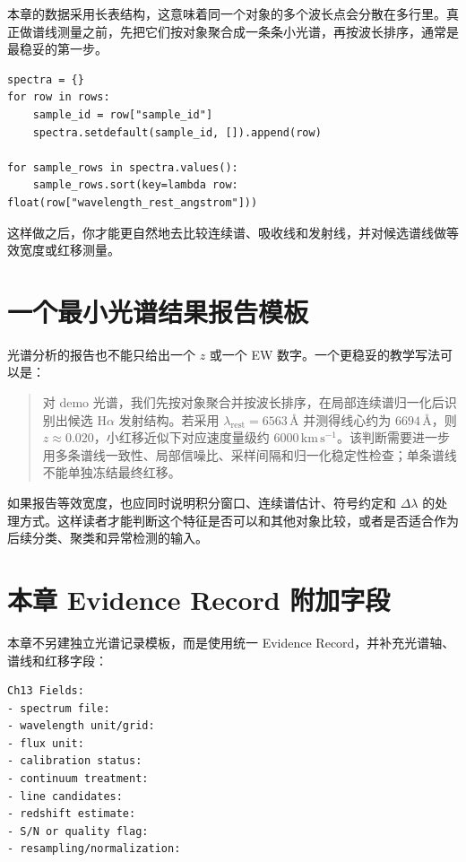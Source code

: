 本章的数据采用长表结构，这意味着同一个对象的多个波长点会分散在多行里。真正做谱线测量之前，先把它们按对象聚合成一条条小光谱，再按波长排序，通常是最稳妥的第一步。

\begin{examplebox}[按对象重组光谱]
\begin{lstlisting}[style=pythonstyle]
spectra = {}
for row in rows:
    sample_id = row["sample_id"]
    spectra.setdefault(sample_id, []).append(row)

for sample_rows in spectra.values():
    sample_rows.sort(key=lambda row: float(row["wavelength_rest_angstrom"]))
\end{lstlisting}
\end{examplebox}

这样做之后，你才能更自然地去比较连续谱、吸收线和发射线，并对候选谱线做等效宽度或红移测量。

\section{一个最小光谱结果报告模板}

光谱分析的报告也不能只给出一个 \(z\) 或一个 EW 数字。一个更稳妥的教学写法可以是：

\begin{quote}
对 demo 光谱，我们先按对象聚合并按波长排序，在局部连续谱归一化后识别出候选 H\(\alpha\) 发射结构。若采用 \(\lambda_{\mathrm{rest}}=6563\,\text{\AA}\) 并测得线心约为 \(6694\,\text{\AA}\)，则 \(z\approx0.020\)，小红移近似下对应速度量级约 \(6000\,\mathrm{km\,s^{-1}}\)。该判断需要进一步用多条谱线一致性、局部信噪比、采样间隔和归一化稳定性检查；单条谱线不能单独冻结最终红移。
\end{quote}

如果报告等效宽度，也应同时说明积分窗口、连续谱估计、符号约定和 \(\Delta\lambda\) 的处理方式。这样读者才能判断这个特征是否可以和其他对象比较，或者是否适合作为后续分类、聚类和异常检测的输入。

\section{本章 Evidence Record 附加字段}

本章不另建独立光谱记录模板，而是使用统一 Evidence Record，并补充光谱轴、谱线和红移字段：

\begin{examplebox}
\begin{lstlisting}[style=terminal]
Ch13 Fields:
- spectrum file:
- wavelength unit/grid:
- flux unit:
- calibration status:
- continuum treatment:
- line candidates:
- redshift estimate:
- S/N or quality flag:
- resampling/normalization:
\end{lstlisting}
\end{examplebox}

